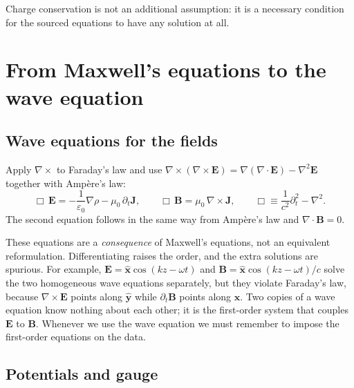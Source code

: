 Charge conservation is not an additional assumption: it is a necessary
condition for the sourced equations to have any solution at all.

\section{From Maxwell's equations to the wave equation}
\label{sec:mb-wave}

\subsection{Wave equations for the fields}

Apply $\nabla\times$ to Faraday's law and use
$\nabla\times(\nabla\times\mathbf E)=\nabla(\nabla\cdot\mathbf E)-\nabla^2\mathbf E$
together with Amp\`ere's law:
\begin{equation}
\Box\,\mathbf E=-\frac1{\varepsilon_0}\nabla\rho-\mu_0\,\partial_t\mathbf J,
\qquad
\Box\,\mathbf B=\mu_0\,\nabla\times\mathbf J,
\qquad
\Box\equiv\frac1{c^2}\partial_t^2-\nabla^2 .
\label{eq:mb-wave-fields}
\end{equation}
The second equation follows in the same way from Amp\`ere's law and
$\nabla\cdot\mathbf B=0$.

These equations are a \emph{consequence} of Maxwell's equations, not an
equivalent reformulation. Differentiating raises the order, and the extra
solutions are spurious. For example, $\mathbf E=\hat{\mathbf x}\cos(kz-\omega t)$
and $\mathbf B=\hat{\mathbf x}\cos(kz-\omega t)/c$ solve the two homogeneous
wave equations separately, but they violate Faraday's law, because
$\nabla\times\mathbf E$ points along $\hat{\mathbf y}$ while $\partial_t\mathbf B$
points along $\hat{\mathbf x}$. Two copies of a wave equation know nothing
about each other; it is the first-order system that couples $\mathbf E$ to
$\mathbf B$. Whenever we use the wave equation we must remember to impose
the first-order equations on the data.

\subsection{Potentials and gauge}

